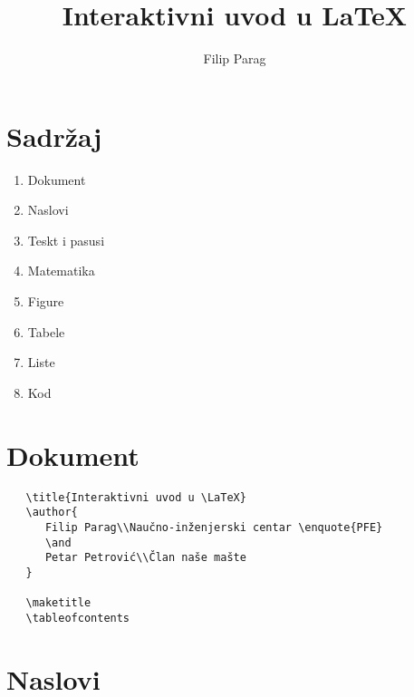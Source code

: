 

\title{Interaktivni uvod u \LaTeX}
\author{Filip Parag}



\maketitle

\section*{Sadržaj}

\begin{enumerate}
   \item Dokument
   \item Naslovi
   \item Teskt i pasusi
   \item Matematika
   \item Figure
   \item Tabele
   \item Liste
   \item Kod
\end{enumerate}

\pagebreak

\section*{Dokument}

\begin{verbatim}
   \title{Interaktivni uvod u \LaTeX}
   \author{
      Filip Parag\\Naučno-inženjerski centar \enquote{PFE}
      \and
      Petar Petrović\\Član naše mašte
   }

   \maketitle
   \tableofcontents
\end{verbatim}

\pagebreak

\section*{Naslovi}

